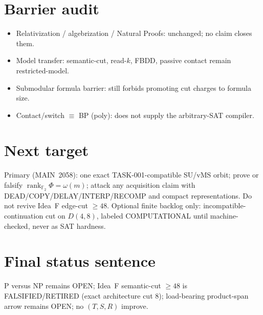 \documentclass[11pt]{article}
\begin{document}
\section*{Barrier audit}
\begin{itemize}
\item Relativization / algebrization / Natural Proofs: unchanged; no claim closes them.
\item Model transfer: semantic-cut, read-$k$, FBDD, passive contact remain restricted-model.
\item Submodular formula barrier: still forbids promoting cut charges to formula size.
\item Contact/switch $\equiv$ BP (poly): does not supply the arbitrary-SAT compiler.
\end{itemize}

\section*{Next target}
Primary (MAIN~2058): one exact TASK-001-compatible SU/vMS orbit; prove or falsify
$\operatorname{rank}_{\mathbb F_2}\Phi=\omega(m)$; attack any acquisition claim with
DEAD/COPY/DELAY/INTERP/RECOMP and compact representations.
Do not revive Idea~F edge-cut $\ge48$. Optional finite backlog only: incompatible-continuation
cut on $D(4,8)$, labeled COMPUTATIONAL until machine-checked, never as SAT hardness.

\section*{Final status sentence}
P versus NP remains OPEN; Idea~F semantic-cut $\ge48$ is FALSIFIED/RETIRED (exact architecture cut $8$); load-bearing product-span arrow remains OPEN; no $(T,S,R)$ improve.
\end{document}
